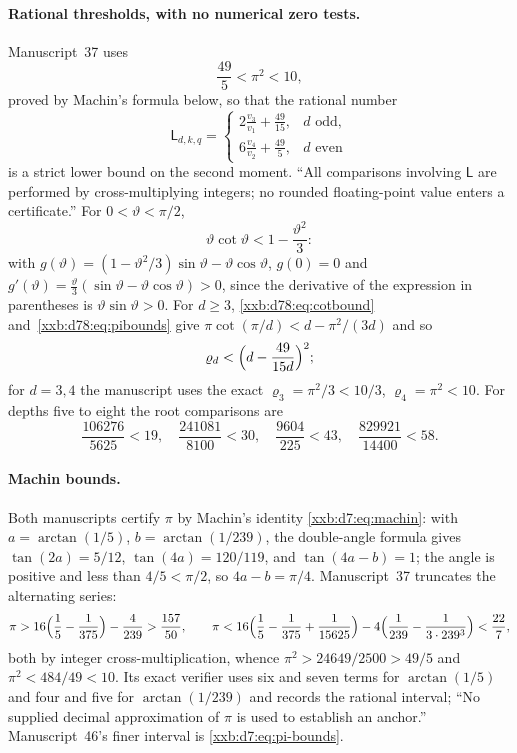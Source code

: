 \documentclass[11pt,a4paper]{article}
\numberwithin{equation}{section}
\theoremstyle{definition}
\theoremstyle{remark}
\theoremstyle{plain}
\begin{document}
\paragraph{Rational thresholds, with no numerical zero tests.}
Manuscript~37 uses
\begin{equation}\label{xxb:d78:eq:pibounds}
 \frac{49}{5}<\pi^2<10,
\end{equation}
proved by Machin's formula below, so that the rational number
\begin{equation}\label{xxb:d78:eq:Lrational}
 \mathsf L_{d,k,q}=
 \begin{cases}
 \displaystyle2\frac{v_3}{v_1}+\frac{49}{15},&d\text{ odd},\\[6pt]
 \displaystyle6\frac{v_4}{v_2}+\frac{49}{5},&d\text{ even}
 \end{cases}
\end{equation}
is a strict lower bound on the second moment.  ``All comparisons involving
$\mathsf L$ are performed by cross-multiplying integers; no rounded
floating-point value enters a certificate.''  For $0<\vartheta<\pi/2$,
\begin{equation}\label{xxb:d78:eq:cotbound}
 \vartheta\cot\vartheta<1-\frac{\vartheta^2}{3}:
\end{equation}
with $g(\vartheta)=(1-\vartheta^2/3)\sin\vartheta-\vartheta\cos\vartheta$,
$g(0)=0$ and $g'(\vartheta)=\frac\vartheta3(\sin\vartheta-\vartheta\cos\vartheta)>0$,
since the derivative of the expression in parentheses is
$\vartheta\sin\vartheta>0$.  For $d\ge3$, \eqref{xxb:d78:eq:cotbound}
and~\eqref{xxb:d78:eq:pibounds} give $\pi\cot(\pi/d)<d-\pi^2/(3d)$ and so
\begin{equation}\label{xxb:d78:eq:betarational}
 \varrho_d<\Bigl(d-\frac{49}{15d}\Bigr)^2;
\end{equation}
for $d=3,4$ the manuscript uses the exact $\varrho_3=\pi^2/3<10/3$,
$\varrho_4=\pi^2<10$.  For depths five to eight the root comparisons are
\[
 \frac{106276}{5625}<19,\quad
 \frac{241081}{8100}<30,\quad
 \frac{9604}{225}<43,\quad
 \frac{829921}{14400}<58.
\]

\paragraph{Machin bounds.}  Both manuscripts certify $\pi$ by Machin's
identity \eqref{xxb:d7:eq:machin}: with $a=\arctan(1/5)$, $b=\arctan(1/239)$,
the double-angle formula gives $\tan(2a)=5/12$, $\tan(4a)=120/119$, and
$\tan(4a-b)=1$; the angle is positive and less than $4/5<\pi/2$, so
$4a-b=\pi/4$.  Manuscript~37 truncates the alternating series:
\[
 \pi>16\Bigl(\frac15-\frac1{375}\Bigr)-\frac4{239}>\frac{157}{50},\qquad
 \pi<16\Bigl(\frac15-\frac1{375}+\frac1{15625}\Bigr)
       -4\Bigl(\frac1{239}-\frac1{3\cdot239^3}\Bigr)<\frac{22}{7},
\]
both by integer cross-multiplication, whence
$\pi^2>24649/2500>49/5$ and $\pi^2<484/49<10$.  Its exact verifier uses six
and seven terms for $\arctan(1/5)$ and four and five for $\arctan(1/239)$ and
records the rational interval; ``No supplied decimal approximation of $\pi$ is
used to establish an anchor.''  Manuscript~46's finer interval is
\eqref{xxb:d7:eq:pi-bounds}.
\end{document}
